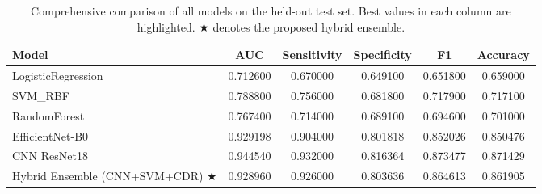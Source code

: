 \begin{table}
\caption{Comprehensive comparison of all models on the held-out test set. Best values in each column are highlighted. ★ denotes the proposed hybrid ensemble.}
\label{tab:full_comparison}
\begin{tabular}{lccccc}
\toprule
Model & AUC & Sensitivity & Specificity & F1 & Accuracy \\
\midrule
LogisticRegression & 0.712600 & 0.670000 & 0.649100 & 0.651800 & 0.659000 \\
SVM\_RBF & 0.788800 & 0.756000 & 0.681800 & 0.717900 & 0.717100 \\
RandomForest & 0.767400 & 0.714000 & 0.689100 & 0.694600 & 0.701000 \\
EfficientNet-B0 & 0.929198 & 0.904000 & 0.801818 & 0.852026 & 0.850476 \\
CNN ResNet18 & 0.944540 & 0.932000 & 0.816364 & 0.873477 & 0.871429 \\
Hybrid Ensemble (CNN+SVM+CDR) ★ & 0.928960 & 0.926000 & 0.803636 & 0.864613 & 0.861905 \\
\bottomrule
\end{tabular}
\end{table}
